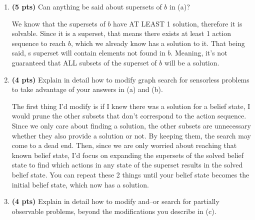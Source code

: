 \documentclass{article}
\begin{document}
\begin{enumerate}
\begin{enumerate}[label=($\alph*$)]


    \item \textbf{(5 pts)} Can anything be said about supersets of $b$ in (a)?

    \color{blue}
        We know that the supersets of $b$ have AT LEAST 1 solution, therefore it is solvable. Since it is a superset, that means there exists at least 1 action sequence to reach $b$, which we already know has a solution to it. That being said, s superset will contain elements not found in $b$. Meaning, it's not guaranteed that ALL subsets of the superset of $b$ will be a solution. 
    \color{black}


    
    \item \textbf{(4 pts)} Explain in detail how to modify graph search for sensorless problems to take advantage of your answers in (a) and (b).

    \color{blue}
        The first thing I'd modify is if I knew there was a solution for a belief state, I would prune the other subsets that don't correspond to the action sequence. Since we only care about finding a solution, the other subsets are unnecessary whether they also provide a solution or not. By keeping them, the search may come to a dead end. Then, since we are only worried about reaching that known belief state, I'd focus on expanding the supersets of the solved belief state to find which actions in any state of the superset results in the solved belief state. You can repeat these 2 things until your belief state becomes the initial belief state, which now has a solution.
    \color{black}


    
    \item \textbf{(4 pts)} Explain in detail how to modify and–or search for partially observable problems, beyond the modifications you describe in (c).


\end{enumerate}
\end{enumerate}
\end{document}
